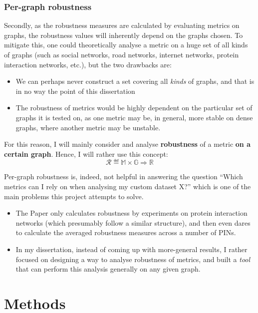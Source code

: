 \subsubsection*{Per-graph robustness}

Secondly, as the robustness measures are calculated by evaluating metrics on graphs, the robustness values will inherently depend on the graphs chosen.
To mitigate this, one could theoretically analyse a metric on a huge set of all kinds of graphs (such as social networks, road networks, internet networks, protein interaction networks, etc.), but the two drawbacks are:
\begin{itemize}
    \item We can perhaps never construct a set covering all \textsl{kinds} of graphs, and that is in no way the point of this dissertation
    \item The robustness of metrics would be highly dependent on the particular set of graphs it is tested on, as one metric may be, in general, more stable on dense graphs, where another metric may be unstable.
\end{itemize}

For this reason, I will mainly consider and analyse \textbf{robustness} of a metric \textbf{on a certain graph}.
Hence, I will rather use this concept:
\begin{equation}
    \mathcal{R} \eqdef \mathbb{M} \times \mathbb{G} \Rightarrow \mathbb{R}
\end{equation}

Per-graph robustness is, indeed, not helpful in answering the question ``Which metrics can I rely on when analysing my custom dataset X?'' which is one of the main problems this project attempts to solve.
\begin{itemize}
    \item The Paper only calculates robustness by experiments on protein interaction networks (which presumably follow a similar structure), and then even dares to calculate the averaged robustness measures across a number of PINs.
    \item In my dissertation, instead of coming up with more-general results, I rather focused on designing a way to analyse robustness of metrics, and built a \textsl{tool} that can perform this analysis generally on any given graph.
\end{itemize}


\section{Methods}\label{sec:methods}

